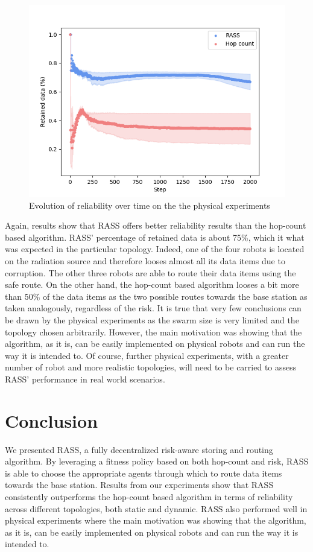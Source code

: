 \begin{figure}[h]
	\centering
    \includegraphics[width=0.90\columnwidth]{images/reliability.png}
    \caption{Evolution of reliability over time on the the physical experiments}
    \label{results:physicalRelaibility}
\end{figure}


Again, results show that RASS offers better reliability results than the hop-count based algorithm. RASS' percentage of retained data is about 75\%, which it what was expected in the particular topology. Indeed, one of the four robots is located on the radiation source and therefore looses almost all its data items due to corruption. The other three robots are able to route their data items using the safe route. On the other hand, the hop-count based algorithm looses a bit more than 50\% of the data items as the two possible routes towards the base station as taken analogously, regardless of the risk. It is true that very few conclusions can be drawn by the physical experiments as the swarm size is very limited and the topology chosen arbitrarily. However, the main motivation was showing that the algorithm, as it is, can be easily implemented on physical robots and can run the way it is intended to. Of course, further physical experiments, with a greater number of robot and more realistic topologies, will need to be carried to assess RASS' performance in real world scenarios.

\section{Conclusion}

We presented RASS, a fully decentralized risk-aware storing and routing algorithm. By leveraging a fitness policy based on both hop-count and risk, RASS is able to choose the appropriate agents through which to route data items towards the base station. Results from our experiments show that RASS consistently outperforms the hop-count based algorithm in terms of reliability across different topologies, both static and dynamic. RASS also performed well in physical experiments where the main motivation was showing that the algorithm, as it is, can be easily implemented on physical robots and can run the way it is intended to.

